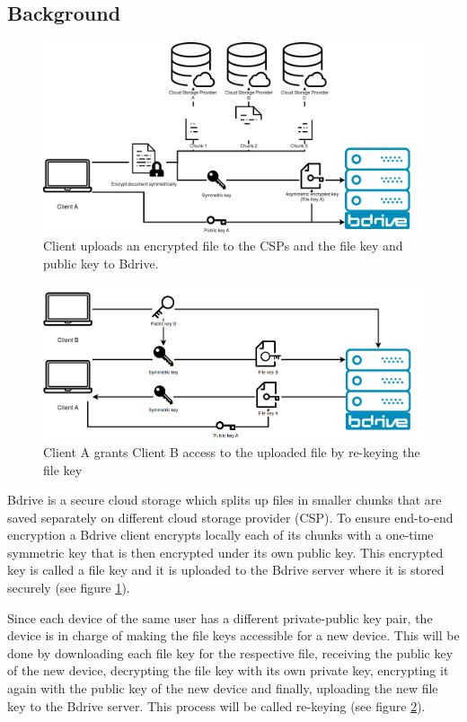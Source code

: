 \subsection{Background}
\begin{figure}[!ht]
\centering
    \includegraphics[width=0.8\linewidth]{img/bdrive1.png}\par 
    \caption{Client uploads an encrypted file to the \ac{CSP}s and the file key and public key to Bdrive.}
    \label{fig:filekey}
\end{figure}
\begin{figure}[!ht]
\centering
    \includegraphics[width=0.8\linewidth]{img/bdrive2.png}\par
    \caption{Client A grants Client B access to the uploaded file by re-keying the file key}
    \label{fig:rekey}
\end{figure}

Bdrive is a secure cloud storage which splits up files in smaller chunks that are saved separately on different cloud storage provider (\ac{CSP}). To ensure end-to-end encryption a Bdrive client encrypts locally each of its chunks with a one-time symmetric key that is then encrypted under its own public key. This encrypted key is called a file key and it is uploaded to the Bdrive server where it is stored securely (see figure \ref{fig:filekey}).

Since each device of the same user has a different private-public key pair, the device is in charge of making the file keys accessible for a new device. This will be done by downloading each file key for the respective file, receiving the public key of the new device, decrypting the file key with its own private key, encrypting it again with the public key of the new device and finally, uploading the new file key to the Bdrive server. This process will be called re-keying (see figure \ref{fig:rekey}).

